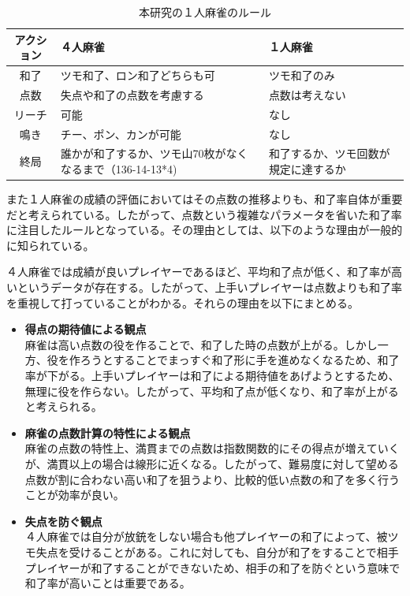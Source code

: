 \begin{table}[htbp]
  \caption{本研究の１人麻雀のルール}
  \label{tb:bakuuti_score}
  \begin{center}
  \begin{tabular}{c|p{6cm}|p{6cm}}
    \hline
    アクション  & ４人麻雀 & １人麻雀 \\\hline\hline
    和了  & ツモ和了、ロン和了どちらも可 & ツモ和了のみ\\\hline
    点数 & 失点や和了の点数を考慮する & 点数は考えない\\\hline
    リーチ & 可能 & なし\\\hline
    鳴き & チー、ポン、カンが可能 & なし\\\hline
    終局 & 誰かが和了するか、ツモ山70枚がなくなるまで（136-14-13*4) & 和了するか、ツモ回数が規定に達するか\\\hline
  \end{tabular}\end{center}
\end{table}

また１人麻雀の成績の評価においてはその点数の推移よりも、和了率自体が重要だと考えられている。したがって、点数という複雑なパラメータを省いた和了率に注目したルールとなっている。その理由としては、以下のような理由が一般的に知られている。\cite{bakuuti2013}

４人麻雀では成績が良いプレイヤーであるほど、平均和了点が低く、和了率が高いというデータが存在する。\cite{kagaku}したがって、上手いプレイヤーは点数よりも和了率を重視して打っていることがわかる。それらの理由を以下にまとめる。

\begin{itemize}
 \item {\bf 得点の期待値による観点}\mbox{}\\ 
  麻雀は高い点数の役を作ることで、和了した時の点数が上がる。しかし一方、役を作ろうとすることでまっすぐ和了形に手を進めなくなるため、和了率が下がる。上手いプレイヤーは和了による期待値をあげようとするため、無理に役を作らない。したがって、平均和了点が低くなり、和了率が上がると考えられる。
 \item {\bf 麻雀の点数計算の特性による観点}\mbox{}\\ 
麻雀の点数の特性上、満貫までの点数は指数関数的にその得点が増えていくが、満貫以上の場合は線形に近くなる。したがって、難易度に対して望める点数が割に合わない高い和了を狙うより、比較的低い点数の和了を多く行うことが効率が良い。
 \item {\bf 失点を防ぐ観点}\mbox{}\\
      ４人麻雀では自分が放銃をしない場合も他プレイヤーの和了によって、被ツモ失点を受けることがある。これに対しても、自分が和了をすることで相手プレイヤーが和了することができないため、相手の和了を防ぐという意味で和了率が高いことは重要である。
\end{itemize}




